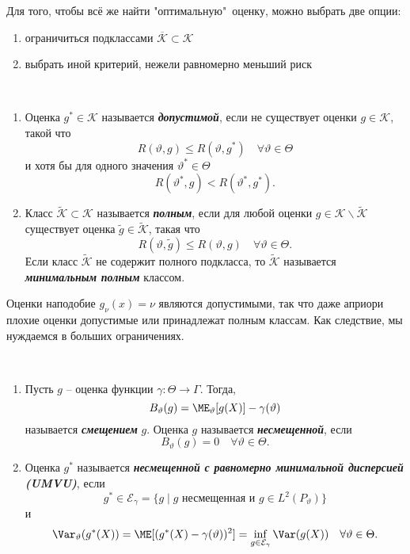 \begin{rmrk}
	Для того, чтобы всё же найти "оптимальную"\ оценку, можно выбрать две опции:
	\begin{enumerate}
		\item ограничиться подклассами $\overline{\mathcal{K}} \subset \mathcal{K}$
		\item выбрать иной критерий, нежели равномерно меньший риск
	\end{enumerate}
\end{rmrk}

\begin{defn} \
	\begin{enumerate}
		\item Оценка $g^* \in \mathcal{K}$ называется \textbf{\textit{допустимой}}, если не существует оценки $g \in \mathcal{K}$, такой что
		 \[R(\vartheta, g) \leq R(\vartheta, g^*) \quad \forall \vartheta \in \Theta \]
		 и хотя бы для одного значения $\vartheta^* \in \Theta$
		 \[ R(\vartheta^*, g) < R(\vartheta^*, g^*).\]
		\item Класс $\tilde{\mathcal{K}} \subset \mathcal{K}$ называется \textbf{\textit{полным}}, если для любой оценки $g \in \mathcal{K} \backslash \tilde{\mathcal{K}}$ существует оценка $\tilde{g} \in \tilde{\mathcal{K}}$, такая что
		\[ R(\vartheta, \tilde{g}) \leq R(\vartheta, g) \quad \forall \vartheta \in \Theta. \]
		Если класс $\tilde{\mathcal{K}}$ не содержит полного подкласса, то $\tilde{\mathcal{K}}$ называется \textbf{\textit{минимальным полным}} классом.
	\end{enumerate}
\end{defn}

\begin{rmrk}
	Оценки наподобие $g_\nu(x)=\nu$ являются допустимыми, так что даже априори плохие оценки допустимые или принадлежат полным классам. Как следствие, мы нуждаемся в больших ограничениях.
\end{rmrk}

\begin{defn} \
	\begin{enumerate}
		\item Пусть $g$ -- оценка функции $\gamma\colon \Theta \rightarrow \Gamma$. Тогда,
		\[ B_\vartheta(g)=\ME_\vartheta[g(X)]-\gamma(\vartheta) \]
		называется \textbf{\textit{смещением}} $g$. Оценка $g$ называется \textbf{\textit{несмещенной}}, если
		 \[B_\vartheta(g)=0 \quad  \forall \vartheta \in \Theta.\]
		\item Оценка $g^*$ называется \textbf{\textit{несмещенной с равномерно минимальной дисперсией (UMVU)}}, если 
		\[g^* \in \mathcal{E}_\gamma = \{ g \mid g \text{ несмещенная и } g \in L^2(P_\vartheta) \}\]
		и
		\begin{equation} \label{eq2.1} 
		\Var_\vartheta(g^*(X))=\ME[(g^*(X) - \gamma(\vartheta))^2]=\inf_{g \in \mathcal{E}_\gamma} \Var(g(X)) \quad \forall \vartheta \in \Theta.
		\end{equation}
	\end{enumerate}
\end{defn}

